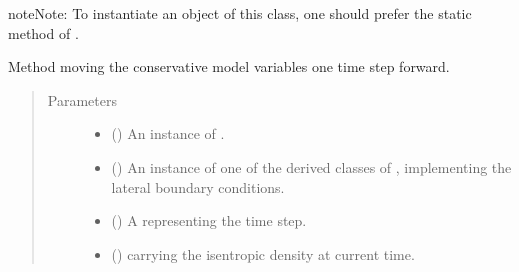 \documentclass[letterpaper,10pt,english]{sphinxmanual}
\begin{document}
\begin{fulllineitems}
\begin{fulllineitems}
\begin{sphinxadmonition}{note}{Note:}
To instantiate an object of this class, one should prefer the static method
{\hyperref[\detokenize{api:dycore.isentropic_prognostic.IsentropicPrognostic.factory}]{}} of
{\hyperref[\detokenize{api:dycore.isentropic_prognostic.IsentropicPrognostic}]{}}.
\end{sphinxadmonition}

\end{fulllineitems}


\begin{fulllineitems}
\label{\detokenize{api:dycore.isentropic_prognostic.TwoTimeLevelsIsentropicPrognostic.step_forward}}
Method moving the conservative model variables one time step forward.
\begin{quote}\begin{description}
\item[{Parameters}] \leavevmode\begin{itemize}
\item {} 
 () \textendash{} An instance of {\hyperref[\detokenize{api:dycore.isentropic_diagnostic.IsentropicDiagnostic}]{}}.

\item {} 
 () \textendash{} An instance of one of the derived classes of {\hyperref[\detokenize{api:dycore.horizontal_boundary.HorizontalBoundary}]{}},
implementing the lateral boundary conditions.

\item {} 
 () \textendash{} A  representing the time step.

\item {} 
 () \textendash{}  carrying the isentropic density at current time.


\end{itemize}
\end{description}
\end{quote}
\end{fulllineitems}
\end{fulllineitems}
\end{document}
